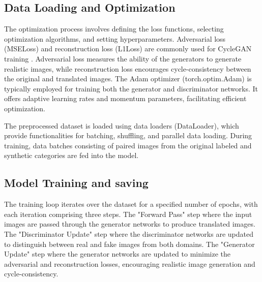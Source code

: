 \documentclass[UKenglish,12pt]{master-style}
\begin{document}
\subsection{Data Loading and Optimization}
The optimization process involves defining the loss functions, selecting optimization algorithms, and setting hyperparameters. Adversarial loss (MSELoss) and reconstruction loss (L1Loss) are commonly used for CycleGAN training \cite{CaGAN} . Adversarial loss measures the ability of the generators to generate realistic images, while reconstruction loss encourages cycle-consistency between the original and translated images. The Adam optimizer (torch.optim.Adam) is typically employed for training both the generator and discriminator networks. It offers adaptive learning rates and momentum parameters, facilitating efficient optimization.

The preprocessed dataset is loaded using data loaders (DataLoader), which provide functionalities for batching, shuffling, and parallel data loading. During training, data batches consisting of paired images from the original labeled and synthetic categories are fed into the model.

\subsection{Model Training and saving}

The training loop iterates over the dataset for a specified number of epochs, with each iteration comprising three steps. The "Forward Pass" step where the input images are passed through the generator networks to produce translated images. The "Discriminator Update" step where the discriminator networks are updated to distinguish between real and fake images from both domains. The "Generator Update" step where the generator networks are updated to minimize the adversarial and reconstruction losses, encouraging realistic image generation and cycle-consistency.
\end{document}
